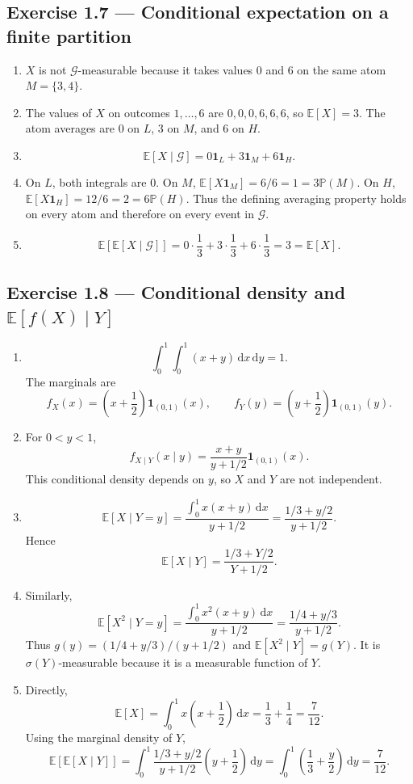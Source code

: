 \documentclass[11pt]{article}
\newcommand{\Pb}{\mathbb{P}}
\newcommand{\E}{\mathbb{E}}
\newcommand{\1}{\mathbf{1}}
\newcommand{\dd}{\,\mathrm{d}}
\begin{document}
\subsection*{Exercise 1.7 --- Conditional expectation on a finite partition}
\begin{enumerate}
  \item $X$ is not $\mathcal G$-measurable because it takes values $0$ and
  $6$ on the same atom $M=\{3,4\}$.
  \item The values of $X$ on outcomes $1,\ldots,6$ are
  $0,0,0,6,6,6$, so $\E[X]=3$. The atom averages are $0$ on $L$, $3$ on $M$,
  and $6$ on $H$.
  \item
  \[
  \E[X\mid\mathcal G]=0\1_L+3\1_M+6\1_H.
  \]
  \item On $L$, both integrals are $0$. On $M$,
  $\E[X\1_M]=6/6=1=3\Pb(M)$. On $H$,
  $\E[X\1_H]=12/6=2=6\Pb(H)$. Thus the defining averaging property holds
  on every atom and therefore on every event in $\mathcal G$.
  \item
  \[
  \E[\E[X\mid\mathcal G]]
  =0\cdot\frac13+3\cdot\frac13+6\cdot\frac13=3=\E[X].
  \]
\end{enumerate}

\subsection*{Exercise 1.8 --- Conditional density and $\E[f(X)\mid Y]$}
\begin{enumerate}
  \item
  \[
  \int_0^1\!\int_0^1(x+y)\dd x\dd y=1.
  \]
  The marginals are
  \[
  f_X(x)=\left(x+\frac12\right)\1_{(0,1)}(x),
  \qquad
  f_Y(y)=\left(y+\frac12\right)\1_{(0,1)}(y).
  \]
  \item For $0<y<1$,
  \[
  f_{X\mid Y}(x\mid y)
  =\frac{x+y}{y+1/2}\1_{(0,1)}(x).
  \]
  This conditional density depends on $y$, so $X$ and $Y$ are not independent.
  \item
  \[
  \E[X\mid Y=y]
  =\frac{\int_0^1x(x+y)\dd x}{y+1/2}
  =\frac{1/3+y/2}{y+1/2}.
  \]
  Hence
  \[
  \E[X\mid Y]=\frac{1/3+Y/2}{Y+1/2}.
  \]
  \item Similarly,
  \[
  \E[X^2\mid Y=y]
  =\frac{\int_0^1x^2(x+y)\dd x}{y+1/2}
  =\frac{1/4+y/3}{y+1/2}.
  \]
  Thus $g(y)=(1/4+y/3)/(y+1/2)$ and
  $\E[X^2\mid Y]=g(Y)$. It is $\sigma(Y)$-measurable because it is a
  measurable function of $Y$.
  \item Directly,
  \[
  \E[X]=\int_0^1x\left(x+\frac12\right)\dd x
  =\frac13+\frac14=\frac7{12}.
  \]
  Using the marginal density of $Y$,
  \[
  \E[\E[X\mid Y]]
  =\int_0^1\frac{1/3+y/2}{y+1/2}\left(y+\frac12\right)\dd y
  =\int_0^1\left(\frac13+\frac y2\right)\dd y
  =\frac7{12}.
  \]
\end{enumerate}
\end{document}
